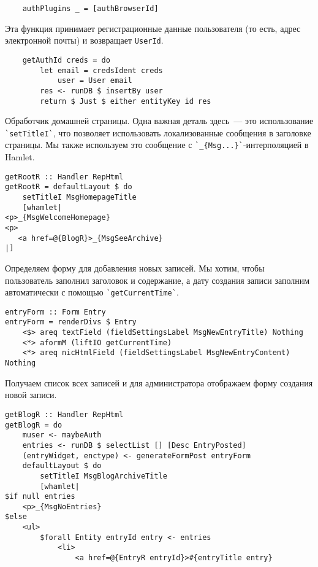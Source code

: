 \begin{lstlisting}
    authPlugins _ = [authBrowserId]
\end{lstlisting}

Эта функция принимает регистрационные данные пользователя (то есть, адрес электронной почты) и возвращает \lstinline!UserId!.

\begin{lstlisting}
    getAuthId creds = do
        let email = credsIdent creds
            user = User email
        res <- runDB $ insertBy user
        return $ Just $ either entityKey id res
\end{lstlisting}%

Обработчик домашней страницы. Одна важная деталь здесь~--- это использование \lstinline'`setTitleI`', что позволяет использовать локализованные сообщения в заголовке страницы. Мы также используем это сообщение с \lstinline'`_{Msg...}`'-интерполяцией в Hamlet.

\begin{lstlisting}
getRootR :: Handler RepHtml
getRootR = defaultLayout $ do
    setTitleI MsgHomepageTitle
    [whamlet|
<p>_{MsgWelcomeHomepage}
<p>
   <a href=@{BlogR}>_{MsgSeeArchive}
|]
\end{lstlisting}%

Определяем форму для добавления новых записей. Мы хотим, чтобы пользователь заполнил заголовок и содержание, а дату создания записи заполним автоматически с помощью \lstinline'`getCurrentTime`'.

\begin{lstlisting}
entryForm :: Form Entry
entryForm = renderDivs $ Entry
    <$> areq textField (fieldSettingsLabel MsgNewEntryTitle) Nothing
    <*> aformM (liftIO getCurrentTime)
    <*> areq nicHtmlField (fieldSettingsLabel MsgNewEntryContent) Nothing
\end{lstlisting}

Получаем список всех записей и для администратора отображаем форму создания новой записи.

\begin{lstlisting}
getBlogR :: Handler RepHtml
getBlogR = do
    muser <- maybeAuth
    entries <- runDB $ selectList [] [Desc EntryPosted]
    (entryWidget, enctype) <- generateFormPost entryForm
    defaultLayout $ do
        setTitleI MsgBlogArchiveTitle
        [whamlet|
$if null entries
    <p>_{MsgNoEntries}
$else
    <ul>
        $forall Entity entryId entry <- entries
            <li>
                <a href=@{EntryR entryId}>#{entryTitle entry}
\end{lstlisting}%

